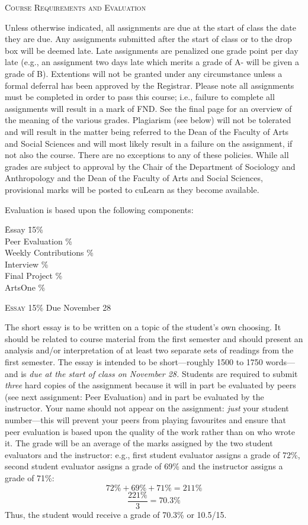 \documentclass[12pt]{article}
\begin{document}
{\Large \textsc{Course Requirements and Evaluation}}

Unless otherwise indicated, all assignments are due at the start of class the date they are due. Any assignments submitted after the start of class or to the drop box will be deemed late. Late assignments are penalized one grade point per day late (e.g., an assignment two days late which merits a grade of A- will be given a grade of B). Extentions will not be granted under any circumstance unless a formal deferral has been approved by the Registrar. Please note all assignments must be completed in order to pass this course; i.e., failure to complete all assignments will result in a mark of FND. See the final page for an overview of the meaning of the various grades. Plagiarism (see below) will not be tolerated and will result in the matter being referred to the Dean of the Faculty of Arts and Social Sciences and will most likely result in a failure on the assignment, if not also the course. There are no exceptions to any of these policies. While all grades are subject to approval by the Chair of the Department of Sociology and Anthropology and the Dean of the Faculty of Arts and Social Sciences, provisional marks will be posted to cuLearn as they become available.

Evaluation is based upon the following components:

\begin{tabbing}
\hspace{.5in} \= Essay \hspace{1.25in} \= 15\% \\
\> Peer Evaluation \% \\
\> Weekly Contributions \% \\
\> Interview \% \\
\> Final Project \% \\
\> ArtsOne \%
\end{tabbing}

{\large \textsc{Essay 15\%} Due November 28}

The short essay is to be written on a topic of the student's own choosing. It should be related to course material from the first semester and should present an analysis and/or interpretation of at least two separate sets of readings from the first semester. The essay is intended to be short---roughly 1500 to 1750 words---and is \textit{due at the start of class on November 28.} Students are required to submit \textit{three} hard copies of the assignment because it will in part be evaluated by peers (see next assignment: Peer Evaluation) and in part be evaluated by the instructor. Your name should not appear on the assignment: \textit{just} your student number---this will prevent your peers from playing favourites and ensure that peer evaluation is based upon the quality of the work rather than on who wrote it. The grade will be an average of the marks assigned by the two student evaluators and the instructor: e.g., first student evaluator assigns a grade of 72\%, second student evaluator assigns a grade of 69\% and the instructor assigns a grade of 71\%:
\[
72\% + 69\% + 71\% = 211\%
\]
\[
{\frac{221\%}{3}}=70.3\%
\]
Thus, the student would receive a grade of 70.3\% or 10.5/15.
\end{document}
